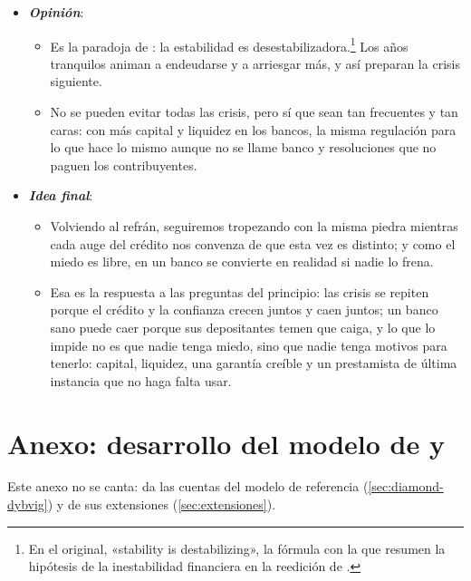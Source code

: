 \documentclass[11pt]{article}
\begin{document}
\begin{itemize}
\begin{itemize}
  \item Los riesgos que vienen: la intermediación no bancaria, los criptoactivos y el riesgo climático.
  \end{itemize}
\item \textbf{\emph{Opinión}}:
  \begin{itemize}
  \item Es la paradoja de : la estabilidad es desestabilizadora.\footnote{En el original, «stability is destabilizing», la fórmula con la que \textcite[xii]{PapadimitriouWray2008Minsky} resumen la hipótesis de la inestabilidad financiera en la reedición de \textcite{Minsky1986Stabilizing}.} Los años tranquilos animan a endeudarse y a arriesgar más, y así preparan la crisis siguiente.
  \item No se pueden evitar todas las crisis, pero sí que sean tan frecuentes y tan caras: con más capital y liquidez en los bancos, la misma regulación para lo que hace lo mismo aunque no se llame banco y resoluciones que no paguen los contribuyentes.
  \end{itemize}
\item \textbf{\emph{Idea final}}:
  \begin{itemize}
  \item Volviendo al refrán, seguiremos tropezando con la misma piedra mientras cada auge del crédito nos convenza de que esta vez es distinto; y como el miedo es libre, en un banco se convierte en realidad si nadie lo frena.
  \item Esa es la respuesta a las preguntas del principio: las crisis se repiten porque el crédito y la confianza crecen juntos y caen juntos; un banco sano puede caer porque sus depositantes temen que caiga, y lo que lo impide no es que nadie tenga miedo, sino que nadie tenga motivos para tenerlo: capital, liquidez, una garantía creíble y un prestamista de última instancia que no haga falta usar.
  \end{itemize}
\end{itemize}

\clearpage
\appendix

\section{Anexo: desarrollo del modelo de  y }\label{anexo:dd}

Este anexo no se canta: da las cuentas del modelo de referencia (\ref{sec:diamond-dybvig}) y de sus extensiones (\ref{sec:extensiones}).
\end{document}
